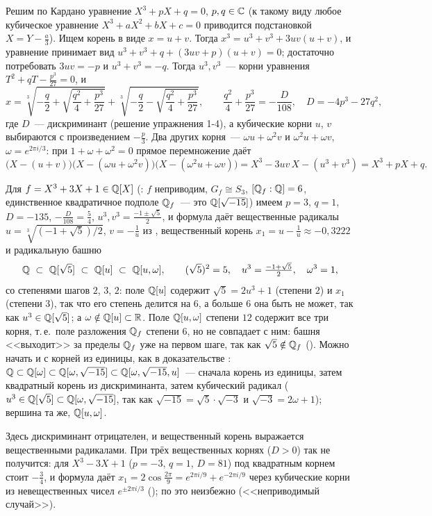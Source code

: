 \begin{example}
Решим по Кардано уравнение $X^3+pX+q=0$, $p,q\in\mathbb C$ (к такому виду любое кубическое уравнение $X^3+aX^2+bX+c=0$
приводится подстановкой $X=Y-\frac a3$). Ищем корень в виде $x=u+v$. Тогда $x^3=u^3+v^3+3uv(u+v)$, и уравнение принимает вид
$u^3+v^3+q+(3uv+p)(u+v)=0$; достаточно потребовать $3uv=-p$ и $u^3+v^3=-q$. Тогда $u^3,v^3$~--- корни уравнения
$T^2+qT-\frac{p^3}{27}=0$, и
\[
x=\sqrt[3]{-\frac q2+\sqrt{\frac{q^2}4+\frac{p^3}{27}}}+\sqrt[3]{-\frac q2-\sqrt{\frac{q^2}4+\frac{p^3}{27}}},\qquad
\frac{q^2}4+\frac{p^3}{27}=-\frac D{108},\quad D=-4p^3-27q^2,
\]
где $D$~--- дискриминант (решение упражнения 1-4), а кубические корни $u$, $v$ выбираются с произведением $-\frac p3$. Два других
корня~--- $\omega u+\omega^2v$ и $\omega^2u+\omega v$, $\omega=e^{2\pi i/3}$: при $1+\omega+\omega^2=0$ прямое перемножение даёт
\[
\bigl(X-(u+v)\bigr)\bigl(X-(\omega u+\omega^2v)\bigr)\bigl(X-(\omega^2u+\omega v)\bigr)=X^3-3uv\,X-(u^3+v^3)=X^3+pX+q .
\]

Для $f=X^3+3X+1\in\mathbb Q[X]$ (: $f$ неприводим, $G_f\cong S_3$, $[\mathbb Q_f:\mathbb Q]=6$, единственное квадратичное подполе
$\mathbb Q_f$~--- это $\mathbb Q[\sqrt{-15}]$) имеем $p=3$, $q=1$, $D=-135$, $-\frac D{108}=\frac54$, $u^3,v^3=\frac{-1\pm\sqrt5}2$, и формула даёт
вещественные радикалы $u=\sqrt[3]{(-1+\sqrt5)/2}$, $v=-\frac1u$ из , вещественный корень $x_1=u-\frac1u\approx-0{,}3222$ и
радикальную башню
\[
\Q\ \subset\ \Q[\sqrt5]\ \subset\ \Q[u]\ \subset\ \Q[u,\omega],\qquad (\sqrt5)^2=5,\quad u^3=\tfrac{-1+\sqrt5}2,\quad\omega^3=1,
\]
со степенями шагов $2$, $3$, $2$: поле $\mathbb Q[u]$ содержит $\sqrt5=2u^3+1$ (степени $2$) и $x_1$ (степени $3$), так что его степень
делится на $6$, а больше $6$ она быть не может, так как $u^3\in\mathbb Q[\sqrt5]$; а $\omega\notin\mathbb Q[u]\subset\mathbb R$. Поле $\mathbb Q[u,\omega]$
степени $12$ содержит все три корня, т.\,е.\ поле разложения $\mathbb Q_f$ степени $6$, но не совпадает с ним: башня <<выходит>> за
пределы $\mathbb Q_f$ уже на первом шаге, так как $\sqrt5\notin\mathbb Q_f$ (). Можно начать и с корней из единицы, как в
доказательстве : $\mathbb Q\subset\mathbb Q[\omega]\subset\mathbb Q[\omega,\sqrt{-15}]\subset\mathbb Q[\omega,\sqrt{-15},u]$~--- сначала корень из
единицы, затем квадратный корень из дискриминанта, затем кубический радикал ($u^3\in\mathbb Q[\sqrt5]\subset\mathbb Q[\omega,\sqrt{-15}]$, так
как $\sqrt{-15}=\sqrt5\cdot\sqrt{-3}$ и $\sqrt{-3}=2\omega+1$); вершина та же, $\mathbb Q[u,\omega]$.

Здесь дискриминант отрицателен, и вещественный корень выражается вещественными радикалами. При трёх вещественных
корнях ($D>0$) так не получится: для $X^3-3X+1$ ($p=-3$, $q=1$, $D=81$) под квадратным корнем стоит $-\frac34$, и
формула даёт $x_1=2\cos\frac{2\pi}9=e^{2\pi i/9}+e^{-2\pi i/9}$ через кубические корни из невещественных чисел
$e^{\pm2\pi i/3}$ (); по  это неизбежно (<<неприводимый случай>>).
\end{example}

